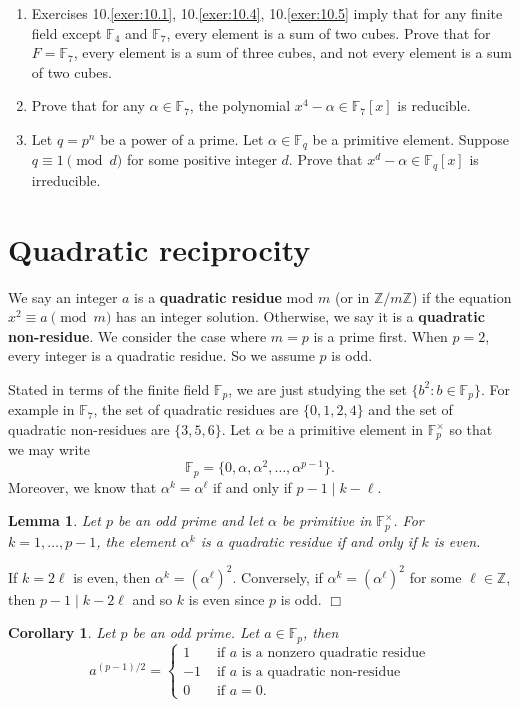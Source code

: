 \documentclass{article}
\def\Z{{\mathbb Z}}
\def\F{{\mathbb F}}
\def\Z{{\mathbb Z}}
\def\F{{\mathbb F}}
\newtheorem{cor}[subsection]{Corollary}
\newtheorem{lemma}[subsection]{Lemma}
\newenvironment{proof}{\noindent {\bf Proof:}}{$\Box$ \vspace{2 ex}}
\begin{document}
\begin{enumerate}[\thesection .1]
    \item Exercises 10.\ref{exer:10.1}, 10.\ref{exer:10.4}, 10.\ref{exer:10.5} imply that for any finite field except $\F_4$ and $\F_7$, every element is a sum of two cubes. Prove that for $F =\F_7$, every element is a sum of three cubes, and not every element is a sum of two cubes.
    \item Prove that for any $\alpha\in\F_7$, the polynomial $x^4 - \alpha\in\F_7[x]$ is reducible.
    \item Let $q = p^n$ be a power of a prime. Let $\alpha\in\F_q$ be a primitive element. Suppose $q\equiv 1\pmod{d}$ for some positive integer $d$. Prove that $x^d - \alpha\in \F_q[x]$ is irreducible.
\end{enumerate}



\section{Quadratic reciprocity}

We say an integer $a$ is a \textbf{quadratic residue} mod $m$ (or in $\Z/m\Z$) if the equation $x^2 \equiv a\pmod{m}$ has an integer solution. Otherwise, we say it is a \textbf{quadratic non-residue}. We consider the case where $m = p$ is a prime first. When $p = 2$, every integer is a quadratic residue. So we assume $p$ is odd.

Stated in terms of the finite field $\F_p$, we are just studying the set $\{b^2\colon b\in\F_p\}$. For example in $\F_7$, the set of quadratic residues are $\{0,1,2,4\}$ and the set of quadratic non-residues are $\{3,5,6\}$. Let $\alpha$ be a primitive element in $\F_p^\times$ so that we may write 
$$\F_p = \{0, \alpha,\alpha^2,\ldots,\alpha^{p-1}\}.$$
Moreover, we know that $\alpha^k = \alpha^\ell$ if and only if $p-1\mid k - \ell$.

\begin{lemma}
    Let $p$ be an odd prime and let $\alpha$ be primitive in $\F_p^\times$. For $k = 1,\ldots,p-1$, the element $\alpha^k$ is a quadratic residue if and only if $k$ is even.
\end{lemma}

\begin{proof}
    If $k = 2\ell$ is even, then $\alpha^k = (\alpha^\ell)^2$. Conversely, if $\alpha^k = (\alpha^\ell)^2$ for some $\ell\in\Z$, then $p - 1 \mid k - 2\ell$ and so $k$ is even since $p$ is odd.
\end{proof}

\begin{cor}
    Let $p$ be an odd prime. Let $a\in\F_p$, then
    $$a^{(p-1)/2} = \begin{cases}
        1&\mbox{ if }a\mbox{ is a nonzero quadratic residue}\\
        -1&\mbox{ if }a\mbox{ is a quadratic non-residue}\\
        0&\mbox{ if }a = 0.
    \end{cases}$$
\end{cor}
\end{document}
